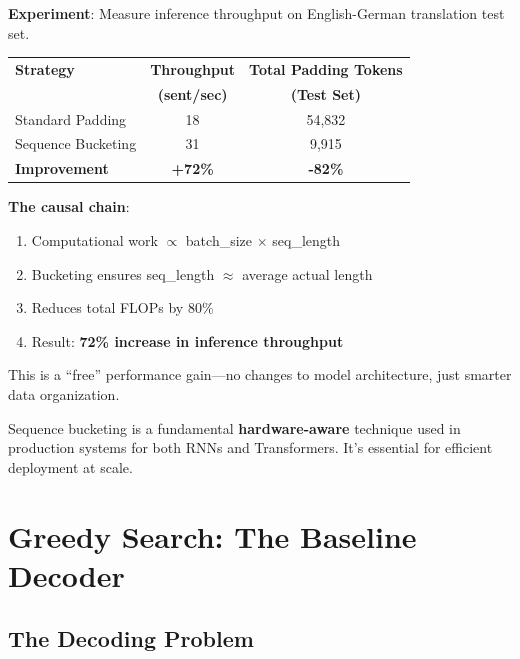 \documentclass{article}
\begin{document}
\begin{tcolorbox}[colback=green!5!white, colframe=green!50!black, title=Empirical Impact: Sequence Bucketing]
\textbf{Experiment}: Measure inference throughput on English-German translation test set.

\vspace{0.3cm}
\begin{center}
\begin{tabular}{|l|c|c|}
\hline
\textbf{Strategy} & \textbf{Throughput} & \textbf{Total Padding Tokens} \\
 & \textbf{(sent/sec)} & \textbf{(Test Set)} \\
\hline
Standard Padding & 18 & 54,832 \\
Sequence Bucketing & 31 & 9,915 \\
\hline
\textbf{Improvement} & \textbf{+72\%} & \textbf{-82\%} \\
\hline
\end{tabular}
\end{center}

\vspace{0.3cm}
\textbf{The causal chain}:
\begin{enumerate}
\item Computational work $\propto$ batch\_size $\times$ seq\_length
\item Bucketing ensures seq\_length $\approx$ average actual length
\item Reduces total FLOPs by 80\%
\item Result: \textbf{72\% increase in inference throughput}
\end{enumerate}

This is a ``free'' performance gain—no changes to model architecture, just smarter data organization.
\end{tcolorbox}

\begin{tcolorbox}[colback=green!5!white, colframe=green!50!black, title=Hardware-Aware Optimization]
Sequence bucketing is a fundamental \textbf{hardware-aware} technique used in production systems for both RNNs and Transformers. It's essential for efficient deployment at scale.
\end{tcolorbox}

\section{Greedy Search: The Baseline Decoder}

\subsection{The Decoding Problem}
\end{document}

